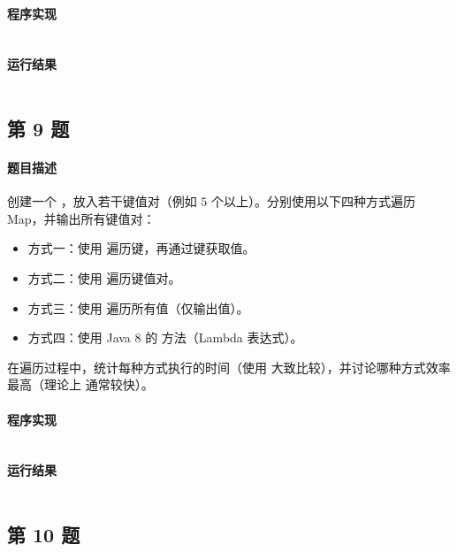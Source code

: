 \documentclass{academics}
\begin{document}
\paragraph{程序实现} {
    \inputminted[label=SetOperations.java]{java}{../src/P08/SetOperations.java}
}

\paragraph{运行结果} {
    \inputminted{text}{../res/P08.out}
}

\subsection{第 9 题}

\paragraph{题目描述} {
    创建一个 ，放入若干键值对（例如 $5$ 个以上）。分别使用以下四种方式遍历 Map，并输出所有键值对：
    \begin{itemize}
        \item 方式一：使用  遍历键，再通过键获取值。
        \item 方式二：使用  遍历键值对。
        \item 方式三：使用  遍历所有值（仅输出值）。
        \item 方式四：使用 Java 8 的  方法（Lambda 表达式）。
    \end{itemize}
    在遍历过程中，统计每种方式执行的时间（使用  大致比较），并讨论哪种方式效率最高（理论上  通常较快）。
}

\paragraph{程序实现} {
    \inputminted[label=MapTraverse.java]{java}{../src/P09/MapTraverse.java}
}

\paragraph{运行结果} {
    \inputminted{text}{../res/P09.out}
}

\subsection{第 10 题}
\end{document}
